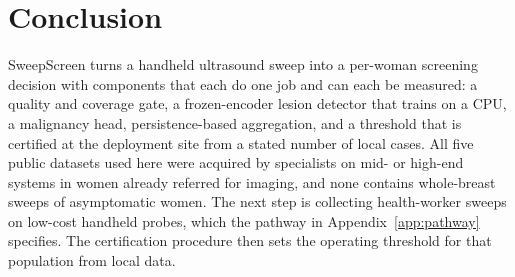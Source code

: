 \section{Conclusion}
SweepScreen turns a handheld ultrasound sweep into a per-woman screening decision with components that each do one job and can each be measured: a quality and coverage gate, a frozen-encoder lesion detector that trains on a CPU, a malignancy head, persistence-based aggregation, and a threshold that is certified at the deployment site from a stated number of local cases. All five public datasets used here were acquired by specialists on mid- or high-end systems in women already referred for imaging, and none contains whole-breast sweeps of asymptomatic women. The next step is collecting health-worker sweeps on low-cost handheld probes, which the pathway in Appendix~\ref{app:pathway} specifies. The certification procedure then sets the operating threshold for that population from local data.
